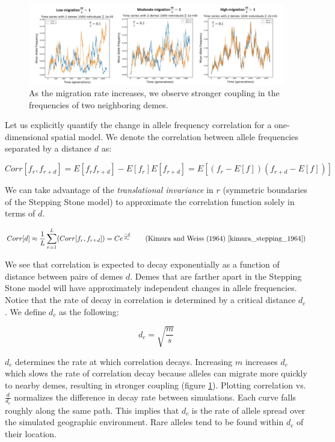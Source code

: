 \begin{figure}[h]
    \centering
    \hspace*{-2cm}
    \includegraphics[scale=0.5]{img/low_high_migration.JPG}
    \caption{As the migration rate increases, we observe stronger coupling in the frequencies of two neighboring demes.}
    \label{fig:low_high_m}
\end{figure}


Let us explicitly quantify the change in allele frequency correlation for a one-dimensional spatial model. We denote the correlation between allele frequencies separated by a distance $d$ as:

\begin{equation}
    Corr[f_r,f_{r+d}] = E[f_r f_{r+d}] - E[f_r] E[f_{r+d}] = E[(f_r - E[f])(f_{r+d} - E[f])]
\end{equation}

We can take advantage of the \textit{translational invariance} in $r$ (symmetric boundaries of the Stepping Stone model) to approximate the correlation function solely in terms of $d$.

\begin{equation}
    Corr[d] \approx \frac{1}{L} \sum_{r=1}^L (Corr[f_r,f_{r+d}]) = Ce^{\frac{-d}{d_c}} \tag{Kimura and Weiss (1964) \cite{kimura_stepping_1964}}
\end{equation}

We see that correlation is expected to decay exponentially as a function of distance between pairs of demes $d$. Demes that are farther apart in the Stepping Stone model will have approximately independent changes in allele frequencies. Notice that the rate of decay in correlation is determined by a critical distance $d_c$. We define $d_c$ as the following:

\begin{equation}
    d_c = \sqrt{\frac{m}{s}}
\end{equation}


$d_c$ determines the rate at which correlation decays. Increasing $m$ increases $d_c$ which slows the rate of correlation decay because alleles can migrate more quickly to nearby demes, resulting in stronger coupling (figure \ref{fig:low_high_m}). Plotting correlation vs. $\frac{d}{d_c}$ normalizes the difference in decay rate between simulations. Each curve falls roughly along the same path. This implies that $d_c$ is the rate of allele spread over the simulated geographic environment. Rare alleles tend to be found within $d_c$ of their location.


